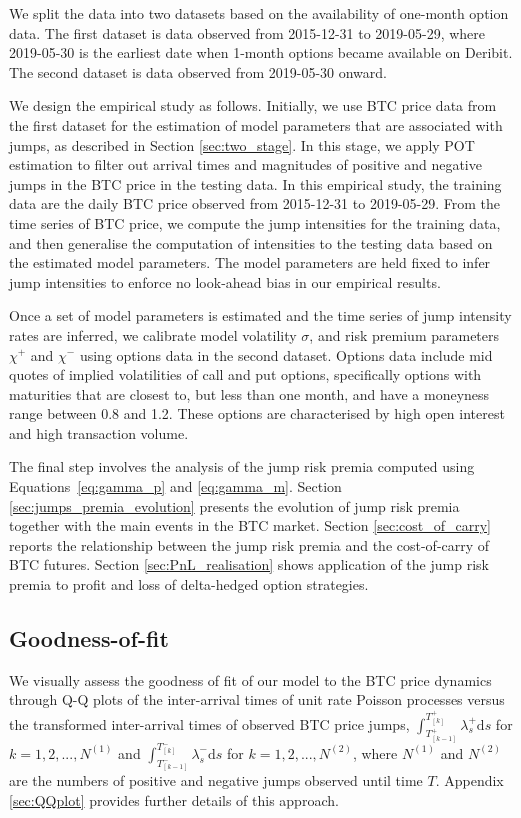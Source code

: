 \documentclass[11pt,a4paper]{article}
\numberwithin{equation}{section}
\theoremstyle{remark}
\theoremstyle{definition}
\begin{document}
We split the data into two datasets based on the availability of one-month option data. The first dataset is data observed from 2015-12-31 to 2019-05-29, where 2019-05-30 is the earliest date when 1-month options became available on Deribit. The second dataset is data observed from 2019-05-30 onward.

We design the empirical study as follows.
Initially, we use BTC price data from the first dataset for the estimation of model parameters that are associated with jumps, as described in Section \ref{sec:two_stage}.
In this stage, we apply POT estimation to filter out arrival times and magnitudes of positive and negative jumps in the BTC price in the testing data.
 In this empirical study, the training data are the daily BTC price observed from 2015-12-31 to 2019-05-29.
From the time series of BTC price, we compute the jump intensities for the training data, and then generalise the computation of intensities to the testing data based on the estimated model parameters.
The model parameters are held fixed to infer jump intensities to enforce no look-ahead bias in our empirical results.

Once a set of model parameters is estimated and the time series of jump intensity rates are inferred, we calibrate model volatility $\sigma$, and risk premium parameters $\chi^+$ and $\chi^-$ using options data in the second dataset.
Options data include mid quotes of implied volatilities of call and put options, specifically options with maturities that are closest to, but less than one month, and have a moneyness range between 0.8 and 1.2. These options are characterised by high open interest and high transaction volume.

The final step involves the analysis of the jump risk premia computed using Equations~\eqref{eq:gamma_p} and \eqref{eq:gamma_m}. Section \ref{sec:jumps_premia_evolution} presents the evolution of jump risk premia together with the main events in the BTC market. Section \ref{sec:cost_of_carry} reports the relationship between the jump risk premia and the cost-of-carry of BTC futures. Section \ref{sec:PnL_realisation} shows application of the jump risk premia to profit and loss of delta-hedged option strategies.

\subsection{Goodness-of-fit}\label{sec:gof}
We visually assess the goodness of fit of our model to the BTC price dynamics through Q-Q plots of the inter-arrival times of unit rate Poisson processes versus the transformed inter-arrival times of observed BTC price jumps,
 $\int_{T^+_{[k-1]}}^{T^+_{[k]}}\lambda^+_s \text{d}s$ for $k = 1,2,...,N^{(1)}$ and $\int_{T^-_{[k-1]}}^{T^-_{[k]}}\lambda^-_s \text{d}s$ for $k = 1,2,..., N^{(2)}$, where $N^{(1)}$ and $N^{(2)}$ are the numbers of positive and negative jumps observed until time $T$.
Appendix \ref{sec:QQplot} provides further details of this approach.
\end{document}
